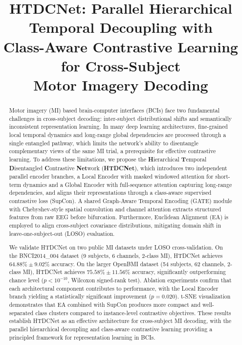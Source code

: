 \documentclass[conference]{IEEEtran}
\begin{document}
\title{HTDCNet: Parallel Hierarchical Temporal Decoupling with\\Class-Aware Contrastive Learning for Cross-Subject\\Motor Imagery Decoding}

\author{
}

\maketitle

\begin{abstract}
Motor imagery (MI) based brain-computer interfaces (BCIs) face two fundamental challenges in cross-subject decoding: inter-subject distributional shifts and semantically inconsistent representation learning. 
In many deep learning architectures, fine-grained local temporal dynamics and long-range global dependencies are processed through a single entangled pathway, which limits the network's ability to disentangle complementary views of the same MI trial, a prerequisite for effective contrastive learning.
To address these limitations, we propose the \textbf{H}ierarchical \textbf{T}emporal \textbf{D}isentangled \textbf{C}ontrastive \textbf{Net}work (\textbf{HTDCNet}), which introduces two independent parallel encoder branches, a Local Encoder with masked windowed attention for short-term dynamics and a Global Encoder with full-sequence attention capturing long-range dependencies, and aligns their representations through a class-aware supervised contrastive loss (SupCon).
A shared Graph-Aware Temporal Encoding (GATE) module with Chebyshev-style spatial convolution and channel attention extracts structured features from raw EEG before bifurcation.
Furthermore, Euclidean Alignment (EA) is employed to align cross-subject covariance distributions, mitigating domain shift in leave-one-subject-out (LOSO) evaluation.

We validate HTDCNet on two public MI datasets under LOSO cross-validation.
On the BNCI2014\_004 dataset (9 subjects, 6 channels, 2-class MI), HTDCNet achieves $64.88\% \pm 9.02\%$ accuracy.
On the larger OpenBMI dataset (54 subjects, 62 channels, 2-class MI), HTDCNet achieves $75.58\% \pm 11.56\%$ accuracy, significantly outperforming chance level ($p < 10^{-10}$, Wilcoxon signed-rank test).
Ablation experiments confirm that each architectural component contributes to performance, with the Local Encoder branch yielding a statistically significant improvement ($p = 0.020$).
t-SNE visualization demonstrates that EA combined with SupCon produces more compact and well-separated class clusters compared to instance-level contrastive objectives.
These results establish HTDCNet as an effective architecture for cross-subject MI decoding, with the parallel hierarchical decoupling and class-aware contrastive learning providing a principled framework for representation learning in BCIs.
\end{abstract}
\end{document}
